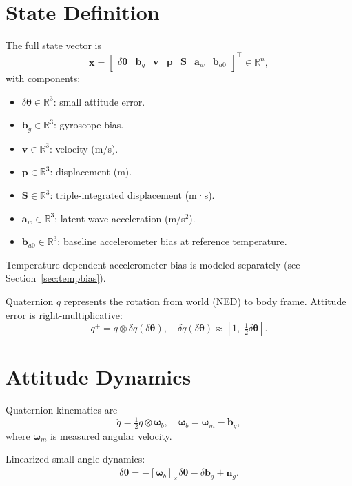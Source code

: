 \documentclass[11pt]{article}
\begin{document}
\section{State Definition}
The full state vector is
\begin{equation}
\bm{x} = \begin{bmatrix}
\delta\bm\theta & \bm b_g & \bm v & \bm p & \bm S & \bm a_w & \bm b_{a0}
\end{bmatrix}^\top \in \mathbb{R}^n,
\end{equation}
with components:
\begin{itemize}
\item $\delta\bm\theta \in \mathbb{R}^3$: small attitude error.
\item $\bm b_g \in \mathbb{R}^3$: gyroscope bias.
\item $\bm v \in \mathbb{R}^3$: velocity (m/s).
\item $\bm p \in \mathbb{R}^3$: displacement (m).
\item $\bm S \in \mathbb{R}^3$: triple-integrated displacement (m·s).
\item $\bm a_w \in \mathbb{R}^3$: latent wave acceleration (m/s$^2$).
\item $\bm b_{a0} \in \mathbb{R}^3$: baseline accelerometer bias at reference temperature.
\end{itemize}

Temperature-dependent accelerometer bias is modeled separately (see Section~\ref{sec:tempbias}).

Quaternion $q$ represents the rotation from world (NED) to body frame.  
Attitude error is right-multiplicative:
\begin{equation}
q^+ = q \otimes \delta q(\delta\bm\theta), 
\quad 
\delta q(\delta\bm\theta) \approx \left[1,\; \tfrac{1}{2}\delta\bm\theta \right].
\end{equation}

\section{Attitude Dynamics}
Quaternion kinematics are
\begin{equation}
\dot q = \tfrac{1}{2} q \otimes \bm\omega_b, 
\quad
\bm\omega_b = \bm\omega_m - \bm b_g,
\end{equation}
where $\bm\omega_m$ is measured angular velocity.  

Linearized small-angle dynamics:
\begin{equation}
\dot{\delta\bm\theta} = -[\bm\omega_b]_\times \delta\bm\theta - \delta\bm b_g + \bm n_g.
\end{equation}
\end{document}
